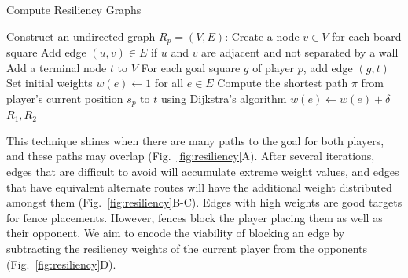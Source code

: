 \documentclass[10pt]{article}
\begin{document}
\begin{algorithm}
\caption{Compute Resiliency Graphs}
\begin{algorithmic}[1]
    \State Construct an undirected graph $R_p = (V, E)$:
    \State \hspace{1em} Create a node $v \in V$ for each board square
    \State \hspace{1em} Add edge $(u, v) \in E$ if $u$ and $v$ are adjacent and not separated by a wall
    \State \hspace{1em} Add a terminal node $t$ to $V$
    \State \hspace{1em} For each goal square $g$ of player $p$, add edge $(g, t)$
    \State \hspace{1em} Set initial weights $w(e) \gets 1$ for all $e \in E$
        \State Compute the shortest path $\pi$ from player’s current position $s_p$ to $t$ using Dijkstra's algorithm
            \State $w(e) \gets w(e) + \delta$
        \EndFor
    \EndFor
\EndFor
\State \Return $R_1, R_2$
\end{algorithmic}
\end{algorithm}

This technique shines when there are many paths to the goal for both players, and these paths may overlap (Fig.~\ref{fig:resiliency}A). After several iterations, edges that are difficult to avoid will accumulate extreme weight values, and edges that have equivalent alternate routes will have the additional weight distributed amongst them (Fig.~\ref{fig:resiliency}B-C). Edges with high weights are good targets for fence placements. However, fences block the player placing them as well as their opponent. We aim to encode the viability of blocking an edge by subtracting the resiliency weights of the current player from the opponents (Fig.~\ref{fig:resiliency}D).
\end{document}
